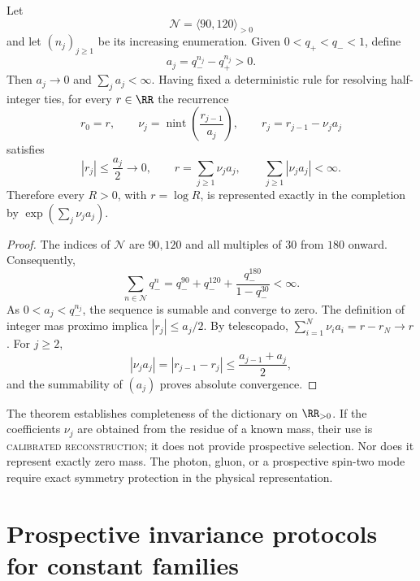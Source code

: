\begin{theorem}
\label{thm:completitud-reconstructiva-positiva}
Let
\[
 \mathcal N=\langle90,120\rangle_{>0}
\]
and let \((n_j)_{j\ge1}\) be its increasing enumeration. Given
\(0<q_+<q_-<1\), define
\[
 a_j=q_-^{n_j}-q_+^{n_j}>0.
\]
Then \(a_j\to0\) and \(\sum_ja_j<\infty\). Having fixed a deterministic rule
for resolving half-integer ties, for every \(r\in\RR\) the recurrence
\[
 r_0=r,\qquad
 \nu_j=\operatorname{nint}\!\left(\frac{r_{j-1}}{a_j}\right),\qquad
 r_j=r_{j-1}-\nu_ja_j
\]
satisfies
\[
 |r_j|\leq\frac{a_j}{2}\longrightarrow0,\qquad
 r=\sum_{j\ge1}\nu_ja_j,\qquad
 \sum_{j\ge1}|\nu_ja_j|<\infty.
\]
Therefore every \(R>0\), with \(r=\log R\), is represented exactly in the
completion by
\(\exp(\sum_j\nu_ja_j)\).
\end{theorem}

\begin{proof}
The indices of \(\mathcal N\) are \(90,120\) and all multiples of \(30\)
from \(180\) onward. Consequently,
\[
 \sum_{n\in\mathcal N}q_-^n
 =q_-^{90}+q_-^{120}
 +\frac{q_-^{180}}{1-q_-^{30}}<\infty.
\]
As \(0<a_j<q_-^{n_j}\), the sequence is sumable and converge to zero. The
definition of integer mas proximo implica
\(|r_j|\le a_j/2\). By telescopado,
\(\sum_{i=1}^{N}\nu_ia_i=r-r_N\to r\). For \(j\ge2\),
\[
 |\nu_ja_j|=|r_{j-1}-r_j|
 \le\frac{a_{j-1}+a_j}{2},
\]
and the summability of \((a_j)\) proves absolute convergence.
\end{proof}

The theorem establishes completeness of the dictionary on \(\RR_{>0}\). If the
coefficients \(\nu_j\) are obtained from the residue of a known mass, their use
is \textsc{calibrated reconstruction}; it does not provide prospective
selection. Nor does it represent exactly zero mass. The photon, gluon, or a
prospective spin-two mode require exact symmetry protection in the physical
representation.

\section{Prospective invariance protocols for constant families}
\label{sec:protocolos-prospectivos-especificos}

